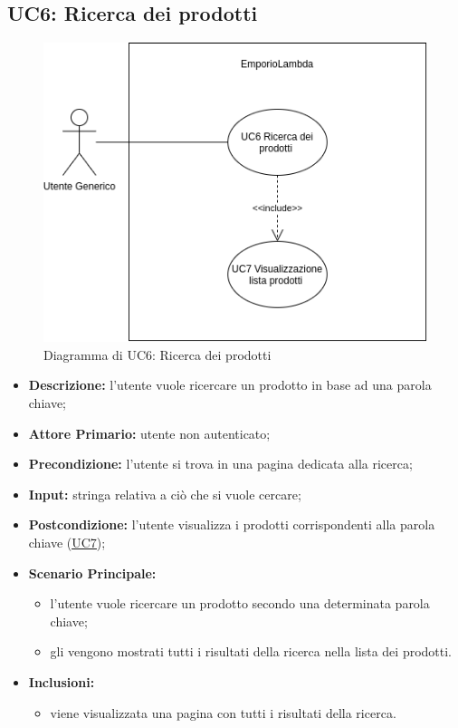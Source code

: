 \subsection{UC6: Ricerca dei prodotti}
\label{sec:UC6}
\begin{figure}[!ht]
    \caption{Diagramma di UC6: Ricerca dei prodotti}
    \vspace{10px}
    \includegraphics[scale=0.5]{../../../Images/AnalisiRequisiti/UC06}
    \centering
\end{figure}
\begin{itemize}
    \item \textbf{Descrizione:} l'utente vuole ricercare un prodotto in base ad una parola chiave;
    \item \textbf{Attore Primario:} utente non autenticato;
    \item \textbf{Precondizione:} l'utente si trova in una pagina dedicata alla ricerca;
    \item \textbf{Input:} stringa relativa a ciò che si vuole cercare;
    \item \textbf{Postcondizione:} l'utente visualizza i prodotti corrispondenti alla parola chiave (\hyperref[sec:UC7]{\underline{UC7}});
    \item \textbf{Scenario Principale:}
          \begin{itemize}
              \item l'utente vuole ricercare un prodotto secondo una determinata parola chiave;
              \item gli vengono mostrati tutti i risultati della ricerca nella lista dei prodotti.
          \end{itemize}
    \item \textbf{Inclusioni:}
          \begin{itemize}
              \item viene visualizzata una pagina con tutti i risultati della ricerca.
          \end{itemize}
\end{itemize}
